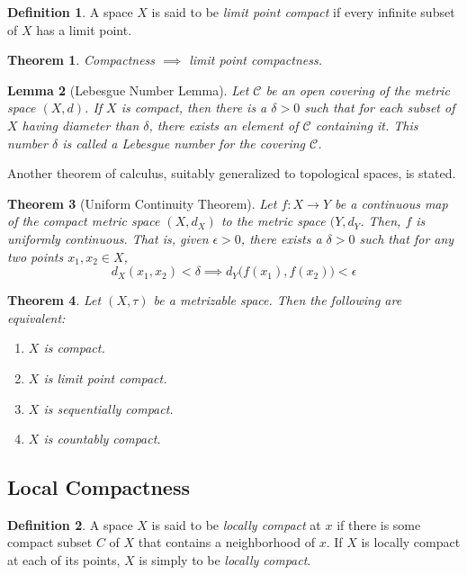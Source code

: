 \documentclass{article}
\newtheorem{theorem}{Theorem}[section]
\newtheorem{lemma}[theorem]{Lemma}
\theoremstyle{remark}
\theoremstyle{definition}
\newtheorem{definition}{Definition}[section]
\begin{document}
\begin{definition}
A space $X$ is said to be \textit{limit point compact} if every infinite subset of $X$ has a limit point. 
\end{definition}

\begin{theorem}
Compactness $\implies$ limit point compactness.  
\end{theorem}

\begin{lemma}[Lebesgue Number Lemma]
Let $\mathscr{C}$ be an open covering of the metric space $(X, d)$. If $X$ is compact, then there is a $\delta > 0$ such that for each subset of $X$ having diameter than $\delta$, there exists an element of $\mathscr{C}$ containing it. This number $\delta$ is called a \textit{Lebesgue number} for the covering $\mathscr{C}$. 
\end{lemma}

Another theorem of calculus, suitably generalized to topological spaces, is stated. 
\begin{theorem}[Uniform Continuity Theorem]
Let $f: X \longrightarrow Y$ be a continuous map of the compact metric space $(X,d_X)$ to the metric space $(Y, d_Y$. Then, $f$ is uniformly continuous. That is, given $\epsilon > 0$, there exists a $\delta > 0$ such that for any two points $x_1, x_2 \in X$, 
\[d_X (x_1, x_2) < \delta \implies d_Y \big( f(x_1), f(x_2)\big) < \epsilon\]
\end{theorem}

\begin{theorem}
Let $(X, \tau)$ be a metrizable space. Then the following are equivalent: 
\begin{enumerate}
    \item $X$ is compact. 
    \item $X$ is limit point compact. 
    \item $X$ is sequentially compact. 
    \item $X$ is countably compact. 
\end{enumerate}
\end{theorem}

\subsection{Local Compactness}
\begin{definition}
A space $X$ is said to be \textit{locally compact} at $x$ if there is some compact subset $C$ of $X$ that contains a neighborhood of $x$. If $X$ is locally compact at each of its points, $X$ is simply to be \textit{locally compact}. 
\end{definition}
\end{document}

